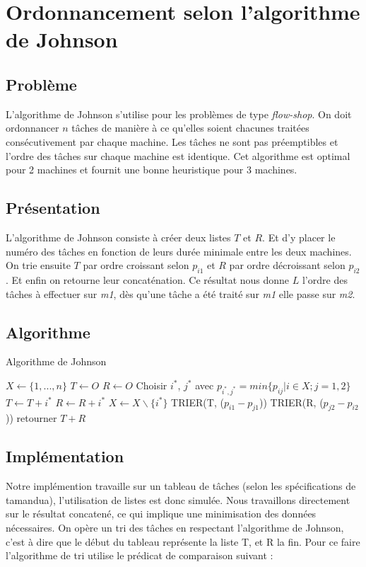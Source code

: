 \section{Ordonnancement selon l'algorithme de Johnson}
\subsection{Problème}
L'algorithme de Johnson s'utilise pour les problèmes de type {\em flow-shop}.
On doit ordonnancer $n$ tâches de manière à ce qu'elles soient chacunes traitées
consécutivement par chaque machine.
Les tâches ne sont pas préemptibles et l'ordre des tâches sur chaque machine est
identique. Cet algorithme est optimal pour 2 machines et fournit une bonne
heuristique pour 3 machines.

\subsection{Présentation}
L'algorithme de Johnson consiste à créer deux listes $T$ et $R$. Et d'y placer 
le numéro des tâches en fonction de leurs durée minimale entre les deux 
machines. On trie ensuite $T$ par ordre croissant selon $p_{i1}$ et $R$ par
ordre décroissant selon $p_{i2}$. Et enfin on retourne leur concaténation.
Ce résultat nous donne $L$ l'ordre des tâches à effectuer sur {\em m1},
dès qu'une tâche a été traité sur {\em m1} elle passe sur {\em m2}.

\subsection{Algorithme}
\begin{algorithm}
\caption{Algorithme de Johnson}
\begin{algorithmic}
\STATE $X \leftarrow \{1,...,n\}$
\STATE $T \leftarrow O$
\STATE $R \leftarrow O$
	\STATE Choisir $i^*$, $j^*$ avec $p_{i^*,j^*} = min\{p_{ij}|i \in X; j = 1,2\}$
		\STATE $T \leftarrow T + i^*$
	\ELSE
		\STATE $R \leftarrow R + i^*$
	\ENDIF
	\STATE $X \leftarrow X\backslash\{i^*\}$
\ENDWHILE
\STATE TRIER(T, ($p_{i1} - p_{j1}$))
\STATE TRIER(R, ($p_{j2} - p_{i2}$))
\STATE retourner $T + R$
\end{algorithmic}
\end{algorithm}

\subsection{Implémentation}
Notre implémention travaille sur un tableau de tâches (selon les spécifications de
tamandua), l'utilisation de listes est donc simulée.
Nous travaillons directement sur le résultat concatené, ce qui implique une
minimisation des données nécessaires. On opère un tri des tâches en respectant
l'algorithme de Johnson, c'est à dire que le début du tableau représente la liste T,
et R la fin. Pour ce faire l'algorithme de tri utilise le prédicat de
comparaison suivant :

